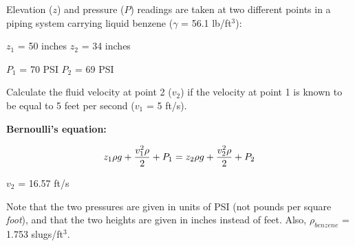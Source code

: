 

Elevation ($z$) and pressure ($P$) readings are taken at two different points in a piping system carrying liquid benzene ($\gamma$ = 56.1 lb/ft$^{3}$):

\vskip 10pt

$z_1$ = 50 inches \hskip 50pt $z_2$ = 34 inches

\vskip 10pt

$P_1$ = 70 PSI \hskip 59pt $P_2$ = 69 PSI

\vskip 10pt

Calculate the fluid velocity at point 2 ($v_2$) if the velocity at point 1 is known to be equal to 5 feet per second ($v_1$ = 5 ft/s).

\vskip 10pt

\noindent
{\bf Bernoulli's equation:}

$$z_1 \rho g + {v_1^2 \rho \over 2} + P_1 = z_2 \rho g + {v_2^2 \rho \over 2} + P_2$$







$v_2$ = 16.57 ft/s

\vskip 10pt

Note that the two pressures are given in units of PSI (not pounds per square {\it foot}), and that the two heights are given in inches instead of feet.  Also, $\rho_{benzene}$ = 1.753 slugs/ft$^{3}$.











